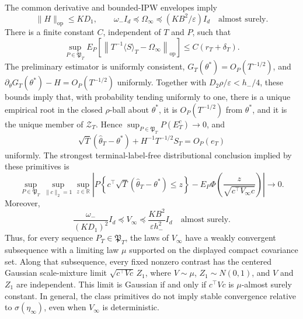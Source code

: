The common derivative and bounded-IPW envelopes imply
\[
 \|H\|_{\mathrm{op}}\le KD_1,
 \qquad \omega_-I_d\preceq\Omega_\infty\preceq(KB^2/\varepsilon)I_d
 \quad\text{almost surely}.
\]
There is a finite constant \(C\), independent of \(T\) and \(P\), such that
\[
 \sup_{P\in\mathfrak P_T}E_P\!\left[\left\|T^{-1}\langle S\rangle_T-\Omega_\infty\right\|_{\mathrm{op}}\right]
 \le C(r_T+\delta_T).
\]
The preliminary estimator is uniformly consistent, \(G_T(\theta^*)=O_P(T^{-1/2})\), and \(\partial_\theta G_T(\theta^*)-H=O_P(T^{-1/2})\) uniformly. Together with \(D_2\rho/\varepsilon<h_-/4\), these bounds imply that, with probability tending uniformly to one, there is a unique empirical root in the closed \(\rho\)-ball about \(\theta^*\), it is \(O_P(T^{-1/2})\) from \(\theta^*\), and it is the unique member of \(\mathcal Z_T\). Hence \(\sup_{P\in\mathfrak P_T}P(E_T^c)\to0\), and
\[
 \sqrt T(\widehat\theta_T-\theta^*)+H^{-1}T^{-1/2}S_T=O_P(e_T)
\]
uniformly. The strongest terminal-label-free distributional conclusion implied by these primitives is
\[
 \sup_{P\in\mathfrak P_T}\sup_{\|c\|_2=1}\sup_{z\in\mathbb R}
 \left|P\left\{c^\top\sqrt T(\widehat\theta_T-\theta^*)\le z\right\}
 -E_P\Phi\left(\frac{z}{\sqrt{c^\top V_\infty c}}\right)\right|\longrightarrow0.
\]
Moreover,
\[
 \frac{\omega_-}{(KD_1)^2}I_d\preceq V_\infty
 \preceq\frac{KB^2}{\varepsilon h_-^2}I_d\quad\text{almost surely}.
\]
Thus, for every sequence \(P_T\in\mathfrak P_T\), the laws of \(V_\infty\) have a weakly convergent subsequence with a limiting law \(\mu\) supported on the displayed compact covariance set. Along that subsequence, every fixed nonzero contrast has the centered Gaussian scale-mixture limit \(\sqrt{c^\top Vc}\,Z_1\), where \(V\sim\mu\), \(Z_1\sim N(0,1)\), and \(V\) and \(Z_1\) are independent. This limit is Gaussian if and only if \(c^\top Vc\) is \(\mu\)-almost surely constant. In general, the class primitives do not imply stable convergence relative to \(\sigma(\eta_\infty)\), even when \(V_\infty\) is deterministic.